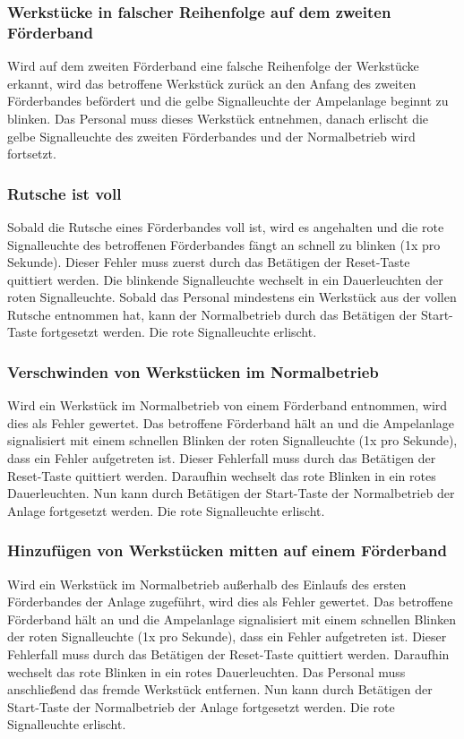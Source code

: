 \documentclass[oneside,a4paper,titlepage]{scrartcl} %
\begin{document}
\subsubsection{Werkstücke in falscher Reihenfolge auf dem zweiten Förderband}
Wird auf dem zweiten Förderband eine falsche Reihenfolge der Werkstücke erkannt, wird das betroffene Werkstück zurück an den Anfang des zweiten Förderbandes befördert und die gelbe Signalleuchte der Ampelanlage beginnt zu blinken. Das Personal muss dieses Werkstück entnehmen, danach erlischt die gelbe Signalleuchte des zweiten Förderbandes und der Normalbetrieb wird fortsetzt.

\subsubsection{Rutsche ist voll}
Sobald die Rutsche eines Förderbandes voll ist, wird es angehalten und die rote Signalleuchte des betroffenen Förderbandes fängt an schnell zu blinken (1x pro Sekunde). Dieser Fehler muss zuerst durch das Betätigen der Reset-Taste quittiert werden. Die blinkende Signalleuchte wechselt in ein Dauerleuchten der roten Signalleuchte. Sobald das Personal mindestens ein Werkstück aus der vollen Rutsche entnommen hat, kann der Normalbetrieb durch das Betätigen der Start-Taste fortgesetzt werden. Die rote Signalleuchte erlischt.

\subsubsection{Verschwinden von Werkstücken im Normalbetrieb}
Wird ein Werkstück im Normalbetrieb von einem Förderband entnommen, wird dies als Fehler gewertet. Das betroffene Förderband hält an und die Ampelanlage signalisiert mit einem schnellen Blinken der roten Signalleuchte (1x pro Sekunde), dass ein Fehler aufgetreten ist. Dieser Fehlerfall muss durch das Betätigen der Reset-Taste quittiert werden. Daraufhin wechselt das rote Blinken in ein rotes Dauerleuchten. Nun kann durch Betätigen der Start-Taste der Normalbetrieb der Anlage fortgesetzt werden. Die rote Signalleuchte erlischt.

\subsubsection{Hinzufügen von Werkstücken mitten auf einem Förderband}
Wird ein Werkstück im Normalbetrieb außerhalb des Einlaufs des ersten Förderbandes der Anlage zugeführt, wird dies als Fehler gewertet. Das betroffene Förderband hält an und die Ampelanlage signalisiert mit einem schnellen Blinken der roten Signalleuchte (1x pro Sekunde), dass ein Fehler aufgetreten ist. Dieser Fehlerfall muss durch das Betätigen der Reset-Taste quittiert werden. Daraufhin wechselt das rote Blinken in ein rotes Dauerleuchten. Das Personal muss anschließend das fremde Werkstück entfernen. Nun kann durch Betätigen der Start-Taste der Normalbetrieb der Anlage fortgesetzt werden. Die rote Signalleuchte erlischt.
\end{document}
